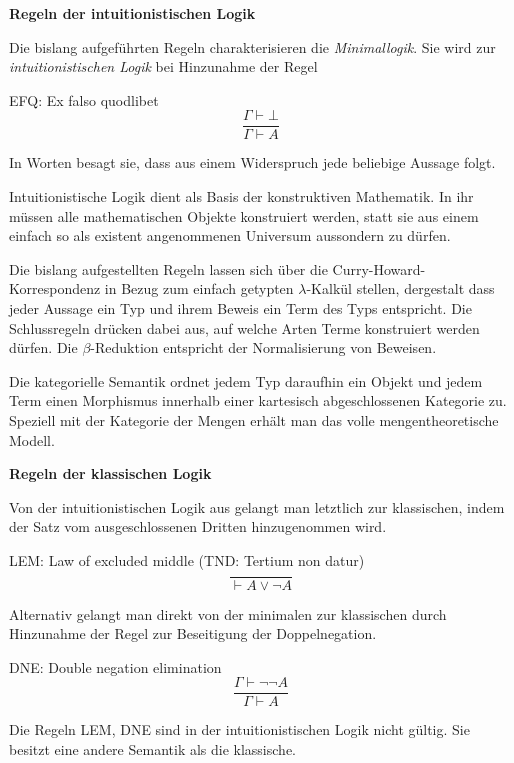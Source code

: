\documentclass[8pt]{beamer}
\newcommand{\strong}[1]{\textsf{\textbf{#1}}}
\newcommand{\parspace}{\vspace{0.8em}}
\begin{document}
\begin{frame}[t]
\vspace{0.5em}
\strong{Regeln der intuitionistischen Logik}

\parspace
Die bislang aufgeführten Regeln charakterisieren die \emph{Minimallogik}.
Sie wird zur \emph{intuitionistischen Logik} bei Hinzunahme der Regel

\begin{block}{EFQ: Ex falso quodlibet}
\[\dfrac{\Gamma\vdash\bot}{\Gamma\vdash A}\]
\end{block}

In Worten besagt sie, dass aus einem Widerspruch jede beliebige
Aussage folgt.

\parspace
Intuitionistische Logik dient als Basis der konstruktiven Mathematik.
In ihr müssen alle mathematischen Objekte konstruiert werden, statt sie
aus einem einfach so als existent angenommenen Universum aussondern
zu dürfen.

\parspace
\begin{small}
Die bislang aufgestellten Regeln lassen sich über die
Curry-Howard-Korrespondenz in Bezug zum einfach getypten $\lambda$-Kalkül
stellen, dergestalt dass jeder Aussage ein Typ und ihrem Beweis ein
Term des Typs entspricht. Die Schlussregeln drücken dabei aus, auf
welche Arten Terme konstruiert werden dürfen. Die $\beta$-Reduktion
entspricht der Normalisierung von Beweisen.

\parspace
Die kategorielle Semantik ordnet jedem Typ daraufhin ein Objekt und jedem
Term einen Morphismus innerhalb einer kartesisch abgeschlossenen Kategorie
zu. Speziell mit der Kategorie der Mengen erhält man das volle
mengentheoretische Modell.
\end{small}
\end{frame}

\begin{frame}[t]
\vspace{0.5em}
\strong{Regeln der klassischen Logik}

\parspace
Von der intuitionistischen Logik aus gelangt man letztlich zur
klassischen, indem der Satz vom ausgeschlossenen Dritten
hinzugenommen wird.

\begin{block}{LEM: Law of excluded middle (TND: Tertium non datur)}
\[\dfrac{}{\vdash A\lor\lnot A}\]
\end{block}

Alternativ gelangt man direkt von der minimalen zur klassischen
durch Hinzunahme der Regel zur Beseitigung der Doppelnegation.

\begin{block}{DNE: Double negation elimination}
\[\dfrac{\Gamma\vdash\lnot\lnot A}{\Gamma\vdash A}\]
\end{block}

Die Regeln LEM, DNE sind in der intuitionistischen Logik nicht gültig.
Sie besitzt eine andere Semantik als die klassische.
\end{frame}
\end{document}

